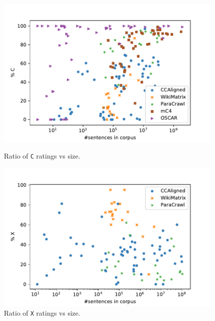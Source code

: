 \begin{figure}[ht]
    \label{ fig7}
    \begin{minipage}[b]{0.5\linewidth}
        \centering
        \includegraphics[width=\linewidth]{static/media/data/quality/C.pdf}
        \caption{Ratio of \texttt{C} ratings vs size.}
        \label{fig:c_app}
        \vspace{4ex}
    \end{minipage}%
    \begin{minipage}[b]{0.5\linewidth}
        \centering
        \includegraphics[width=\linewidth]{static/media/data/quality/X.pdf}
        \caption{Ratio of \texttt{X} ratings vs size.}
        \label{fig:x}
        \vspace{4ex}
    \end{minipage}
    \begin{minipage}[b]{0.5\linewidth}
        \centering

\end{minipage}
\end{figure}
